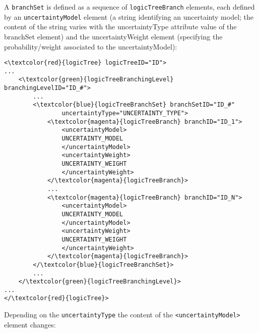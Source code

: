 A \Verb+branchSet+ is defined as a sequence of  \Verb+logicTreeBranch+ elements, each defined by an \Verb+uncertaintyModel+ element (a string identifying an uncertainty model; the content of the string varies with the uncertaintyType attribute value of the branchSet element) and the uncertaintyWeight element (specifying the probability/weight associated to the uncertaintyModel):
\begin{Verbatim}[frame=single, commandchars=\\\{\}]
<\textcolor{red}{logicTree} logicTreeID="ID">
...
	<\textcolor{green}{logicTreeBranchingLevel} branchingLevelID="ID_#">
		...
		<\textcolor{blue}{logicTreeBranchSet} branchSetID="ID_#"
				uncertaintyType="UNCERTAINTY_TYPE">
			<\textcolor{magenta}{logicTreeBranch} branchID="ID_1">
				<uncertaintyModel>
				UNCERTAINTY_MODEL
				</uncertaintyModel>
				<uncertaintyWeight>
				UNCERTAINTY_WEIGHT
				</uncertaintyWeight>
			</\textcolor{magenta}{logicTreeBranch}>
			...
			<\textcolor{magenta}{logicTreeBranch} branchID="ID_N">
				<uncertaintyModel>
				UNCERTAINTY_MODEL
				</uncertaintyModel>
				<uncertaintyWeight>
				UNCERTAINTY_WEIGHT
				</uncertaintyWeight>
			</\textcolor{magenta}{logicTreeBranch}>
		</\textcolor{blue}{logicTreeBranchSet}>
		...
	</\textcolor{green}{logicTreeBranchingLevel}>
...
</\textcolor{red}{logicTree}>
\end{Verbatim}
Depending on the \Verb+uncertaintyType+ the content of the \Verb+<uncertaintyModel>+ element changes:
